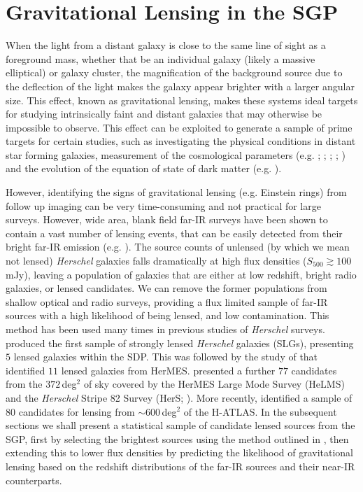\section{Gravitational Lensing in the SGP}

When the light from a distant galaxy is close to the same line of sight as a foreground mass, whether that be an individual galaxy (likely a massive elliptical) or galaxy cluster, the magnification of the background source due to the deflection of the light makes the galaxy appear brighter with a larger angular size. This effect, known as gravitational lensing, makes these systems ideal targets for studying intrinsically faint and distant galaxies that may otherwise be impossible to observe. This effect can be exploited to generate a sample of prime targets for certain studies, such as investigating the physical conditions in distant star forming galaxies, measurement of the cosmological parameters (e.g. \citealt{Kochanek_1992}; \citealt{Kochanek_1996}; \citealt{Grillo_2008}; \citealt{Oguri_2012}; \citealt{Eales_2015}) and the evolution of the equation of state of dark matter (e.g. \citealt{Zhang_2009}). 

However, identifying the signs of gravitational lensing (e.g. Einstein rings) from follow up imaging can be very time-consuming and not practical for large surveys. However, wide area, blank field far-IR surveys have been shown to contain a vast number of lensing events, that can be easily detected from their bright far-IR emission (e.g. \citealt{Blain_1996, Perrotta_2002, Negrello_2007, Paciga_2009, Bakx_2020}). The source counts of unlensed (by which we mean not lensed) \textit{Herschel} galaxies falls dramatically at high flux densities ($S_{500} \gtrsim 100\,$mJy), leaving a population of galaxies that are either at low redshift, bright radio galaxies, or lensed candidates. We can remove the former populations from shallow optical and radio surveys, providing a flux limited sample of far-IR sources with a high likelihood of being lensed, and low contamination. This method has been used many times in previous studies of \textit{Herschel} surveys. \citealt{Negrello_2010} produced the first sample of strongly lensed \textit{Herschel} galaxies (SLGs), presenting $5$ lensed galaxies within the SDP. This was followed by the study of \citealt{Wardlow_2013} that identified $11$ lensed galaxies from HerMES. \citealt{Nayyeri_2016} presented a further $77$ candidates from the $372\,$deg$^2$ of sky covered by the HerMES Large Mode Survey (HeLMS) and the \textit{Herschel} Stripe 82 Survey (HerS; \citealt{Viero_2014}). More recently, \citealt{Negrello_2017} identified a sample of $80$ candidates for lensing from $\sim 600\,$deg$^2$ of the H-ATLAS. In the subsequent sections we shall present a statistical sample of candidate lensed sources from the SGP, first by selecting the brightest sources using the method outlined in \citealt{Negrello_2017}, then extending this to lower flux densities by predicting the likelihood of gravitational lensing based on the redshift distributions of the far-IR sources and their near-IR counterparts. 

